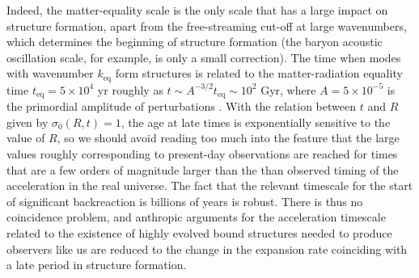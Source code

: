 \documentclass[11pt, a4paper]{article}
\newcommand{\keq}{k_{\mathrm{eq}}}
\newcommand{\teq}{t_{\mathrm{eq}}}
\begin{document}
Indeed, the matter-equality scale is the only scale that has a large impact on structure formation, apart from the free-streaming cut-off at large wavenumbers, which determines the beginning of structure formation \cite{Hofmann:2002nu, *Green:2003un, *Green:2005fa, *Green:2005kf} (the baryon acoustic oscillation scale, for example, is only a small correction). The time when modes with wavenumber $\keq$ form structures is related to the matter-radiation equality time $\teq=5\times10^4$ yr roughly as $t\sim A^{-3/2}\teq\sim10^{2}$ Gyr, where $A=5\times10^{-5}$ \cite{Ade:2015xua} is the primordial amplitude of perturbations \cite{Rasanen:2008it}. With the relation between $t$ and $R$ given by $\sigma_0(R,t)=1$, the age at late times is exponentially sensitive to the value of $R$, so we should avoid reading too much into the feature that the large values roughly corresponding to present-day observations are reached for times that are a few orders of magnitude larger than the than observed timing of the acceleration in the real universe. The fact that the relevant timescale for the start of significant backreaction is billions of years is robust. There is thus no coincidence problem, and anthropic arguments for the acceleration timescale related to the existence of highly evolved bound structures needed to produce observers like us are reduced to the change in the expansion rate coinciding with a late period in structure formation.
\end{document}
